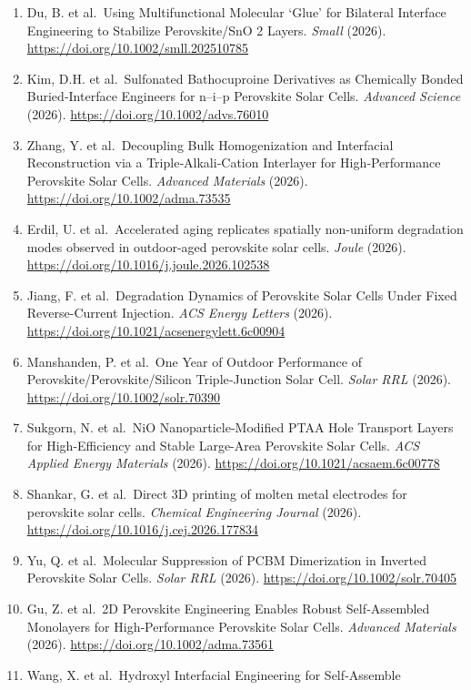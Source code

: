 \documentclass[
  11pt,
]{article}
\begin{document}
\begin{enumerate}
\item
  Du, B. et al.~Using Multifunctional Molecular `Glue' for Bilateral
  Interface Engineering to Stabilize Perovskite/SnO 2 Layers.
  \emph{Small} (2026). \url{https://doi.org/10.1002/smll.202510785}
\item
  Kim, D.H. et al.~Sulfonated Bathocuproine Derivatives as Chemically
  Bonded Buried‐Interface Engineers for n--i--p Perovskite Solar Cells.
  \emph{Advanced Science} (2026).
  \url{https://doi.org/10.1002/advs.76010}
\item
  Zhang, Y. et al.~Decoupling Bulk Homogenization and Interfacial
  Reconstruction via a Triple‐Alkali‐Cation Interlayer for
  High‐Performance Perovskite Solar Cells. \emph{Advanced Materials}
  (2026). \url{https://doi.org/10.1002/adma.73535}
\item
  Erdil, U. et al.~Accelerated aging replicates spatially non-uniform
  degradation modes observed in outdoor-aged perovskite solar cells.
  \emph{Joule} (2026). \url{https://doi.org/10.1016/j.joule.2026.102538}
\item
  Jiang, F. et al.~Degradation Dynamics of Perovskite Solar Cells Under
  Fixed Reverse-Current Injection. \emph{ACS Energy Letters} (2026).
  \url{https://doi.org/10.1021/acsenergylett.6c00904}
\item
  Manshanden, P. et al.~One Year of Outdoor Performance of
  Perovskite/Perovskite/Silicon Triple‐Junction Solar Cell. \emph{Solar
  RRL} (2026). \url{https://doi.org/10.1002/solr.70390}
\item
  Sukgorn, N. et al.~NiO Nanoparticle-Modified PTAA Hole Transport
  Layers for High-Efficiency and Stable Large-Area Perovskite Solar
  Cells. \emph{ACS Applied Energy Materials} (2026).
  \url{https://doi.org/10.1021/acsaem.6c00778}
\item
  Shankar, G. et al.~Direct 3D printing of molten metal electrodes for
  perovskite solar cells. \emph{Chemical Engineering Journal} (2026).
  \url{https://doi.org/10.1016/j.cej.2026.177834}
\item
  Yu, Q. et al.~Molecular Suppression of PCBM Dimerization in Inverted
  Perovskite Solar Cells. \emph{Solar RRL} (2026).
  \url{https://doi.org/10.1002/solr.70405}
\item
  Gu, Z. et al.~2D Perovskite Engineering Enables Robust Self‐Assembled
  Monolayers for High‐Performance Perovskite Solar Cells. \emph{Advanced
  Materials} (2026). \url{https://doi.org/10.1002/adma.73561}
\item
  Wang, X. et al.~Hydroxyl Interfacial Engineering for Self‐Assemble

\end{enumerate}
\end{document}
